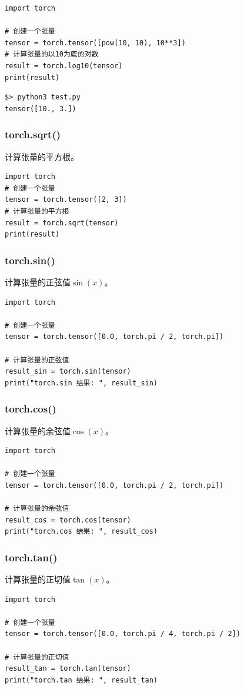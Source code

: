 \begin{lstlisting}[style=pythonstyle]
import torch

# 创建一个张量
tensor = torch.tensor([pow(10, 10), 10**3])
# 计算张量的以10为底的对数
result = torch.log10(tensor)
print(result)
\end{lstlisting}
\begin{lstlisting}[style=demostyle,numbers=none]
$> python3 test.py
tensor([10., 3.])
\end{lstlisting}

\subsubsection{torch.sqrt()}
计算张量的平方根。
\begin{lstlisting}[style=pythonstyle]
import torch
# 创建一个张量
tensor = torch.tensor([2, 3])
# 计算张量的平方根
result = torch.sqrt(tensor)
print(result)
\end{lstlisting}

\subsubsection{torch.sin()}
计算张量的正弦值$\sin(x)$。
\begin{lstlisting}[style=pythonstyle]
import torch

# 创建一个张量
tensor = torch.tensor([0.0, torch.pi / 2, torch.pi])

# 计算张量的正弦值
result_sin = torch.sin(tensor)
print("torch.sin 结果: ", result_sin)
\end{lstlisting}

\subsubsection{torch.cos()}
计算张量的余弦值$\cos(x)$。
\begin{lstlisting}[style=pythonstyle]
import torch

# 创建一个张量
tensor = torch.tensor([0.0, torch.pi / 2, torch.pi])

# 计算张量的余弦值
result_cos = torch.cos(tensor)
print("torch.cos 结果: ", result_cos)
\end{lstlisting}

\subsubsection{torch.tan()}
计算张量的正切值$\tan(x)$。
\begin{lstlisting}[style=pythonstyle]
import torch

# 创建一个张量
tensor = torch.tensor([0.0, torch.pi / 4, torch.pi / 2])

# 计算张量的正切值
result_tan = torch.tan(tensor)
print("torch.tan 结果: ", result_tan)
\end{lstlisting}


